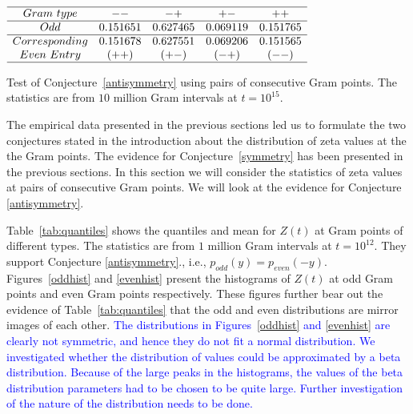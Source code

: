 \documentclass[twoside]{article}
\theoremstyle{definition}
\begin{document}
{\begin{table}
\centering \(\begin{array}{ccccc}
\hline
 Gram~type&   --   & -+   & +-   & ++  \\
\hline
Odd & 0.151651&0.627465&0.069119&0.151765\\
\hline
Corresponding& 0.151678 & 0.627551 & 0.069206& 0.151565\\ 
Even~Entry     & (++)     & (+-)   & (-+)  & (--) \\
\hline
\end{array}\)
\caption{Test of Conjecture~\ref{antisymmetry} using pairs of consecutive Gram points.  The statistics are from $10$ million Gram intervals at $t=10^{15}$.} \label{tab:pairtest}
\end{table}


The empirical data presented in the  {previous sections led us to formulate the two conjectures stated in the introduction 
about the distribution of zeta values at the the Gram points. }
The evidence for  Conjecture~\ref{symmetry} has been presented in the previous sections. 
In this section we will consider the statistics of zeta values at pairs of consecutive Gram points. We will look at the evidence for Conjecture \ref{antisymmetry}.  

Table~\ref{tab:quantiles} shows the quantiles and mean for  $Z(t)$ at Gram points of different types.  The statistics are from $1$ million Gram intervals at $t=10^{12}$. They support 
Conjecture \ref{antisymmetry}., i.e.,  $p_{odd}(y) = p_{even}(-y)$.
Figures~\ref{oddhist} and \ref{evenhist}  present the histograms of $Z(t)$ at odd Gram points and even Gram points respectively. These figures further bear out the evidence of Table~\ref{tab:quantiles} that the odd and even distributions are mirror images of each other. \textcolor{blue}{ The distributions in Figures~\ref{oddhist} and \ref{evenhist} are clearly not symmetric, and hence they do not fit a normal distribution. We investigated whether the distribution of values could be approximated by a beta distribution. Because of the large peaks in the histograms, the values of the beta distribution parameters had to be chosen to be quite large. Further investigation of the nature of the distribution needs to be done.
}

}
\end{document}
